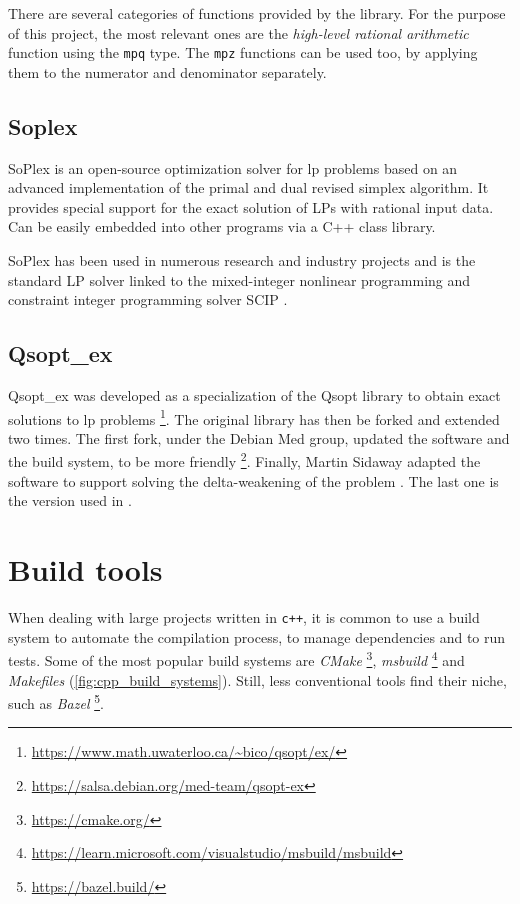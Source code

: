 There are several categories of functions provided by the library.
For the purpose of this project, the most relevant ones are the \textit{high-level rational arithmetic} function using the \texttt{mpq} type.
The \texttt{mpz} functions can be used too, by applying them to the numerator and denominator separately.

\subsection*{Soplex}

SoPlex is an open-source optimization solver for \gls{lp} problems based on an advanced implementation of the primal and dual revised simplex algorithm.
It provides special support for the exact solution of LPs with rational input data.
Can be easily embedded into other programs via a C++ class library.

SoPlex has been used in numerous research and industry projects and is the standard LP solver linked to the mixed-integer nonlinear programming and constraint integer programming solver SCIP \cite{man:soplex}.

\subsection*{Qsopt\_ex}

Qsopt\_ex was developed as a specialization of the Qsopt library to obtain exact solutions to \gls{lp} problems \footnote{\url{https://www.math.uwaterloo.ca/~bico/qsopt/ex/}}.
The original library has then be forked and extended two times.
The first fork, under the Debian Med group, updated the software and the build system, to be more friendly \footnote{\url{https://salsa.debian.org/med-team/qsopt-ex}}.
Finally, Martin Sidaway adapted the software to support solving the delta-weakening of the problem \cite{repo:qsopt-ex}.
The last one is the version used in \dlinear.

\section{Build tools}

When dealing with large projects written in \texttt{c++}, it is common to use a build system to automate the compilation process, to manage dependencies and to run tests.
Some of the most popular build systems are \textit{CMake} \footnote{\url{https://cmake.org/}}, \textit{msbuild} \footnote{\url{https://learn.microsoft.com/visualstudio/msbuild/msbuild}} and \textit{Makefiles} (\autoref{fig:cpp_build_systems}).
Still, less conventional tools find their niche, such as \textit{Bazel} \footnote{\url{https://bazel.build/}}.

